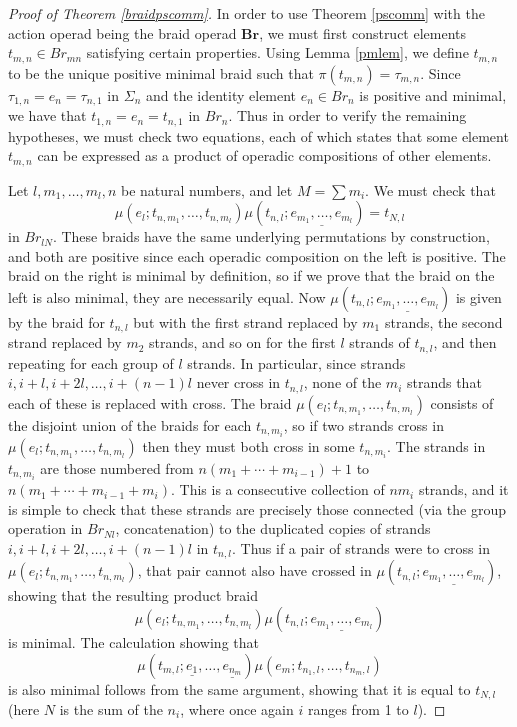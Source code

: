 \documentclass{amsbook} %
\newcommand{\mb}{\mathbf}
\numberwithin{section}{chapter}
\begin{document}
\begin{proof}[Proof of Theorem \ref{braidpscomm}]
In order to use Theorem \ref{pscomm} with the action operad being the braid operad $\mb{Br}$, we must first construct elements $t_{m,n} \in Br_{mn}$ satisfying certain properties.  Using Lemma \ref{pmlem}, we define $t_{m,n}$ to be the unique positive minimal braid such that $\pi(t_{m,n}) = \tau_{m,n}$.  Since $\tau_{1,n} = e_{n} = \tau_{n,1}$ in $\Sigma_{n}$ and the identity element $e_{n} \in Br_{n}$ is positive and minimal, we have that $t_{1,n} = e_{n} = t_{n,1}$ in $Br_{n}$.  Thus in order to verify the remaining hypotheses, we must check two equations, each of which states that some element $t_{m,n}$ can be expressed as a product of operadic compositions of other elements.

Let $l, m_{1}, \ldots, m_{l}, n$ be natural numbers, and let $M = \sum m_{i}$.  We must check that
\[
\mu(e_{l}; t_{n, m_{1}}, \ldots, t_{n, m_{l}}) \mu(t_{n,l}; \underline{e_{m_{1}}, \ldots, e_{m_{l}}}) = t_{N, l}
\]
in $Br_{lN}$.  These braids have the same underlying permutations by construction, and both are positive since each operadic composition on the left is positive.  The braid on the right is minimal by definition, so if we prove that the braid on the left is also minimal, they are necessarily equal.  Now $\mu(t_{n,l}; \underline{e_{m_{1}}, \ldots, e_{m_{l}}})$ is given by the braid for $t_{n,l}$ but with the first strand replaced by $m_{1}$ strands, the second strand replaced by $m_{2}$ strands, and so on for the first $l$ strands of $t_{n,l}$, and then repeating for each group of $l$ strands.  In particular, since strands $i, i+l, i+2l, \ldots, i + (n-1)l$ never cross in $t_{n,l}$, none of the $m_{i}$ strands that each of these is replaced with cross.  The braid $\mu(e_{l}; t_{n, m_{1}}, \ldots, t_{n, m_{l}})$ consists of the disjoint union of the braids for each $t_{n,m_{i}}$, so if two strands cross in $\mu(e_{l}; t_{n, m_{1}}, \ldots, t_{n, m_{l}})$ then they must both cross in some $t_{n,m_{i}}$.  The strands in $t_{n,m_{i}}$ are those numbered from $n(m_{1} + \cdots + m_{i-1}) + 1$ to $n(m_{1} + \cdots + m_{i-1} + m_{i})$.  This is a consecutive collection of $nm_{i}$ strands, and it is simple to check that these strands are precisely those connected (via the group operation in $Br_{Nl}$, concatenation) to the duplicated copies of strands $i, i+l, i+2l, \ldots, i + (n-1)l$ in $t_{n,l}$.  Thus if a pair of strands were to cross in $\mu(e_{l}; t_{n, m_{1}}, \ldots, t_{n, m_{l}})$, that pair cannot also have crossed in $\mu(t_{n,l}; \underline{e_{m_{1}}, \ldots, e_{m_{l}}})$, showing that the resulting product braid
\[
\mu(e_{l}; t_{n, m_{1}}, \ldots, t_{n, m_{l}}) \mu(t_{n,l}; \underline{e_{m_{1}}, \ldots, e_{m_{l}}})
\]
is minimal.  The calculation showing that
\[
\mu(t_{m,l}; \underline{e_{1}}, \ldots, \underline{e_{n_{m}}}) \mu(e_{m}; t_{n_{1}, l}, \ldots, t_{n_{m}, l})
\]
is also minimal follows from the same argument, showing that it is equal to $t_{N, l}$ (here $N$ is the sum of the $n_{i}$, where once again $i$ ranges from 1 to $l$).


\end{proof}
\end{document}
